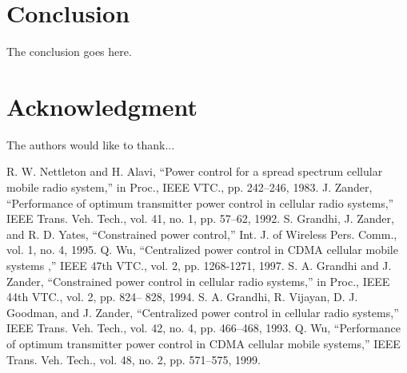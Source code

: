 \documentclass[conference]{IEEEtran}
\begin{document}
\section{Conclusion}
The conclusion goes here.





\section*{Acknowledgment}


The authors would like to thank...







%
%
%
\begin{thebibliography}{1}

R. W. Nettleton and H. Alavi, “Power control for a spread spectrum cellular mobile radio system,” in Proc., IEEE VTC., pp. 242–246, 1983. 
J. Zander, “Performance of optimum transmitter power control in cellular radio systems,” IEEE Trans. Veh. Tech., vol. 41, no. 1, pp. 57–62, 1992.
S. Grandhi, J. Zander, and R. D. Yates, “Constrained power control,” Int. J. of Wireless Pers. Comm., vol. 1, no. 4, 1995.
Q. Wu, “Centralized power control in CDMA cellular mobile systems ,” IEEE 47th VTC., vol. 2, pp. 1268-1271, 1997.
S. A. Grandhi and J. Zander, “Constrained power control in cellular radio systems,” in Proc., IEEE 44th VTC., vol. 2, pp. 824– 828, 1994. 
S. A. Grandhi, R. Vijayan, D. J. Goodman, and J. Zander, “Centralized power control in cellular radio systems,” IEEE Trans. Veh. Tech., vol. 42, no. 4, pp. 466–468, 1993.
Q. Wu, “Performance of optimum transmitter power control in CDMA cellular mobile systems,” IEEE Trans. Veh. Tech., vol. 48, no. 2, pp. 571–575, 1999.
\end{thebibliography}


\end{document}
